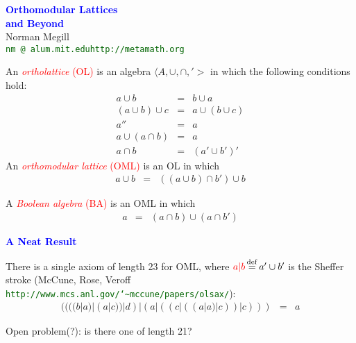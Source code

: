 \documentclass{slides}
\begin{document}
\raggedright
\pagecolor{mint}


\begin{slide}
\begin{center}
\textcolor{blue}{\textbf{\LARGE Orthomodular Lattices\\
and Beyond}}\\
\vspace{3ex}
{\large Norman Megill}\\
\vspace{1ex}
\textcolor{darkgreen}{\texttt{nm {}@ alum.mit.edu\qquad http://metamath.org}}
\end{center}
\end{slide}

\begin{slide}
An \textcolor{red}{\textit{ortholattice} (OL)} is an algebra
$\langle A,\cup,\cap,'>$ in which the following conditions hold:
\begin{eqnarray}
a\cup b & = & b\cup a\\
(a\cup b)\cup c & = & a\cup (b\cup c)\\
a'' & = & a\\
a\cup (a\cap b) & = & a\\
a\cap b & = & (a'\cup b')'
\end{eqnarray}
An \textcolor{red}{\textit{orthomodular lattice} (OML)} is an OL in which
\begin{eqnarray}
a\cup b & = & ((a\cup b)\cap b')\cup b
\end{eqnarray}


A \textcolor{red}{\textit{Boolean algebra} (BA)}
is an OML in which
\begin{eqnarray}
a & = & (a\cap b)\cup (a\cap b')
\end{eqnarray}
\end{slide}

\begin{slide}
\textcolor{blue}{\textbf{A Neat Result}}

There is a single axiom of length 23 for OML, where
$\textcolor{red}{a|b}\,{\buildrel\rm def\over =}\,
a'\cup b'$ is the Sheffer stroke (McCune, Rose, Veroff
\textcolor{darkgreen}{
\texttt{http://www.mcs.anl.gov/{\char`\~}mccune/papers/olsax/}}):
\begin{eqnarray}
((((b|a)|(a|c))|d)|(a|((c|((a|a)|c))|c))) &=
  & a  %
\end{eqnarray}

Open problem(?):  is there one of length 21?
\end{slide}
\end{document}
